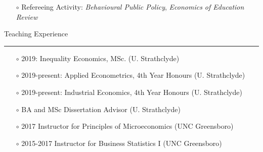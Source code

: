 \documentclass[12pt,a4paper]{article}
\begin{document}
		\begin{itemize}
		\item[$\circ$] Refereeing Activity: \textit{Behavioural Public Policy}, \textit{Economics of Education Review}
		\end{itemize}

	\bigskip

	\noindent \textsf{{\large Teaching Experience}}	 \vspace{0.1cm} \hrule \vspace{0.2cm}	

		\begin{itemize}
		\item[$\circ$] 2019: Inequality Economics, MSc. (U. Strathclyde)
		\item[$\circ$] 2019-present: Applied Econometrics, 4th Year Honours (U. Strathclyde)
		\item[$\circ$] 2019-present: Industrial Economics, 4th Year Honours (U. Strathclyde)
		\item[$\circ$] BA and MSc Dissertation Advisor (U. Strathclyde)
		\item[$\circ$] 2017 Instructor for Principles of Microeconomics  (UNC Greensboro)
		\item[$\circ$] 2015-2017 Instructor for Business Statistics I  (UNC Greensboro)
		\end{itemize}

		
	
	
				
	

		
		
		         
\end{document}

